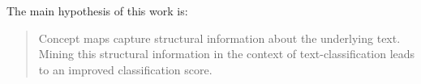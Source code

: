 The main hypothesis of this work is:
\begin{quote}
Concept maps capture structural information about the underlying text. Mining this structural information in the context of text-classification leads to an improved classification score.
\end{quote}


